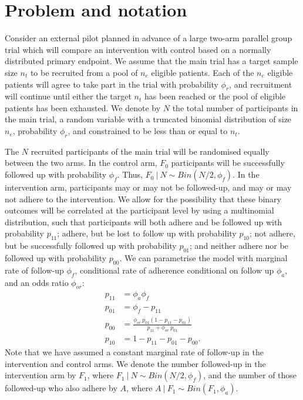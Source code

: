 \documentclass[AMA,STIX1COL]{WileyNJD-v2}
\begin{document}

\section{Problem and notation}\label{sec:problem}


Consider an external pilot planned in advance of a large two-arm parallel group trial which will compare an intervention with control based on a normally distributed primary endpoint. We assume that the main trial has a target sample size $n_t$ to be recruited from a pool of $n_e$ eligible patients. Each of the $n_e$ eligible patients will agree to take part in the trial with probability $\phi_r$, and recruitment will continue until either the target $n_t$ has been reached or the pool of eligible patients has been exhausted. We denote by $N$ the total number of participants in the main trial, a random variable with a truncated binomial distribution of size $n_e$, probability $\phi_r$, and constrained to be less than or equal to $n_t$.

The $N$ recruited participants of the main trial will be randomised equally between the two arms. In the control arm, $F_0$ participants will be successfully followed up with probability $\phi_f$. Thus, $F_0 ~|~ N \sim Bin(N/2, \phi_f)$. In the intervention arm, participants may or may not be followed-up, and may or may not adhere to the intervention. We allow for the possibility that these binary outcomes will be correlated at the participant level by using a multinomial distribution, such that participants will both adhere and be followed up with probability $p_{11}$; adhere, but be lost to follow up with probability $p_{10}$; not adhere, but be successfully followed up with probability $p_{01}$; and neither adhere nor be followed up with probability $p_{00}$. We can parametrise the model with marginal rate of follow-up $\phi_f$, conditional rate of adherence conditional on follow up $\phi_a$, and an odds ratio $\phi_{or}$:
\begin{align*}
p_{11} &= \phi_a \phi_f \\
p_{01} &= \phi_f - p_{11} \\
p_{00} &= \frac{\phi_{or} ~ p_{01}(1-p_{11}-p_{01})}{p_{11} + \phi_{or} ~ p_{01}} \\
p_{10} &= 1 - p_{11} - p_{01} - p_{00}.
\end{align*}
Note that we have assumed a constant marginal rate of follow-up in the intervention and control arms. We denote the number followed-up in the intervention arm by $F_1$, where $F_1 ~|~ N\sim Bin(N/2, \phi_f)$, and the number of those followed-up who also adhere by $A$, where $A ~|~ F_1 \sim Bin(F_1, \phi_a)$. 
\end{document}

